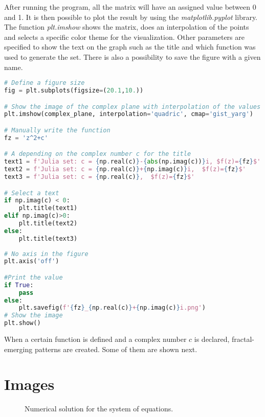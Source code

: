 \documentclass{article}
\begin{document}
After running the program, all the matrix will have an assigned value between 0 and 1. It is then possible to plot the result by using the \textit{matplotlib.pyplot} library. The function \textit{plt.imshow} shows the matrix, does an interpolation of the points and selects a specific color theme for the visualization.
Other parameters are specified to show the text on the graph such as the title and which function was used to generate the set. There is also a possibility to save the figure with a given name.

\begin{lstlisting}[language = Python, frame = single]
# Define a figure size
fig = plt.subplots(figsize=(20.1,10.))

# Show the image of the complex plane with interpolation of the values
plt.imshow(complex_plane, interpolation='quadric', cmap='gist_yarg')

# Manually write the function
fz = 'z^2+c'

# A depending on the complex number c for the title
text1 = f'Julia set: c = {np.real(c)}-{abs(np.imag(c))}i, $f(z)={fz}$'
text2 = f'Julia set: c = {np.real(c)}+{np.imag(c)}i,  $f(z)={fz}$'
text3 = f'Julia set: c = {np.real(c)},  $f(z)={fz}$'

# Select a text 
if np.imag(c) < 0:
    plt.title(text1)
elif np.imag(c)>0:    
    plt.title(text2)
else:
    plt.title(text3)
    
# No axis in the figure
plt.axis('off')

#Print the value 
if True:
    pass
else:
    plt.savefig(f'{fz}_{np.real(c)}+{np.imag(c)}i.png')
# Show the image
plt.show()
\end{lstlisting}

When a certain function is defined and a complex number $c$ is declared, fractal-emerging patterns are created. Some of them are shown next.

\newpage

\section{Images}
\begin{figure}[h]
    \caption{Numerical solution for the system of equations.}
    \label{fig:sol}
\end{figure}


\newpage
\printbibliography[title = {References}]
\end{document}

